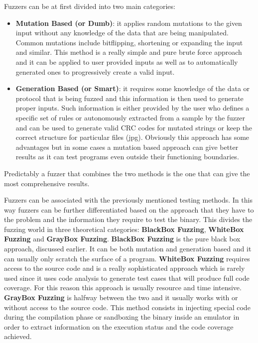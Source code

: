 \documentclass[../main.tex]{subfiles}
\begin{document}
Fuzzers can be at first divided into two main categories:

\begin{itemize}
  \item{\textbf{Mutation Based (or Dumb)}: it applies random mutations to the
  given  input without any knowledge of the data that are being manipulated.
  Common  mutations include bitflipping, shortening or expanding the input and
  similar.  This  method is a really simple and pure brute force approach and it
  can be  applied  to user provided inputs as well as to automatically generated
  ones to  progressively create a valid input.}

  \item{\textbf{Generation Based (or Smart)}: it requires some knowledge of the
  data or protocol that is being fuzzed and this information is then used to
  generate proper inputs. Such information is either provided by the user
  who defines a specific set of rules or autonomously extracted from a sample
  by the  fuzzer and can be used to generate valid CRC codes for mutated  strings  or  keep the correct  structure for particular files (jpg). Obviously this approach has some  advantages but in some cases a mutation based approach can  give better results  as it can test programs even outside their functioning  boundaries.}

\end{itemize}

Predictably a fuzzer that combines the two methods is the one that can give the most comprehensive results.

Fuzzers can be associated with the previously mentioned testing methods. In this way fuzzers can be further differentiated based on the approach that they have to the problem and the information they require to test the binary. This divides the fuzzing world in three theoretical categories: \textbf{BlackBox Fuzzing}, \textbf{WhiteBox Fuzzing} and \textbf{GrayBox Fuzzing}. \textbf{BlackBox Fuzzing} is the pure black box approach, discussed earlier. It can be both mutation and generation based and it can usually only scratch the surface of a program. \textbf{WhiteBox Fuzzing} requires access to the source code and is a really sophisticated approach which is rarely used since it uses code analysis to generate test cases that will produce full code coverage. For this reason this approach is usually resource and time intensive. \textbf{GrayBox Fuzzing} is halfway between the two and it usually works with or without access to the source code. This method consists in injecting special code during the compilation phase or sandboxing the binary inside an emulator in order to extract information on the execution status and the code coverage achieved.
\end{document}
